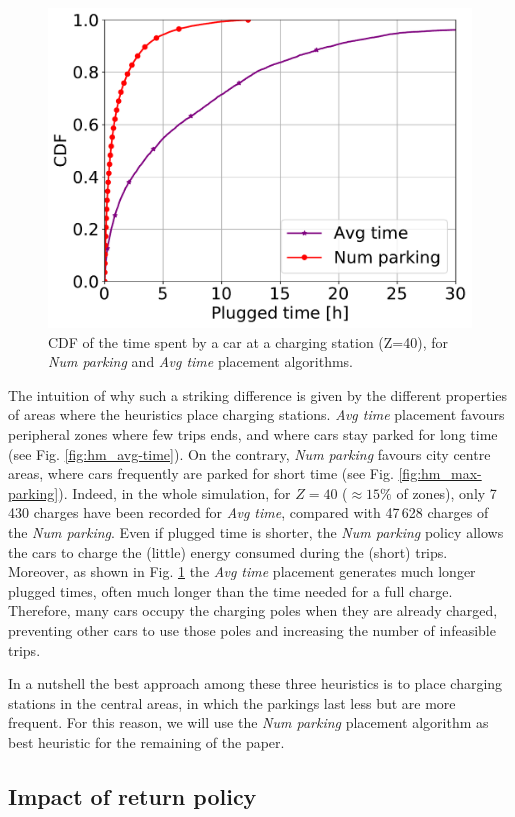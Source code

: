 \begin{figure}[ht]
	\centering
	\includegraphics[width=0.5\columnwidth]{figures/CDF_parking_time_per_algorithm.pdf}
	\caption{CDF of the time spent by a car at a charging station (Z=40), for \textit{Num parking} and \textit{Avg time} placement algorithms. }
		\label{fig:CDF_parking_time_per_algorithm}
\end{figure}

The intuition of why such a striking difference is given by the different properties of areas where the heuristics place charging stations. \textit{Avg time} placement favours peripheral zones where few trips ends, and where cars stay parked for long time (see Fig. \ref{fig:hm_avg-time}). On the contrary, \textit{Num parking} favours city centre areas, where cars frequently are parked for short time (see Fig. \ref{fig:hm_max-parking}). Indeed, in the whole simulation, for $Z=40$ ($\approx 15\%$ of zones), only 7\,430 charges have been recorded for \textit{Avg time}, compared with 47\,628 charges of the \textit{Num parking}.
Even if plugged time is shorter, the \textit{Num parking} policy allows the cars to charge the (little) energy consumed during the (short) trips.
Moreover, as shown in Fig. \ref{fig:CDF_parking_time_per_algorithm} the \textit{Avg time} placement generates much longer plugged times, often much longer than the time needed for a full charge. Therefore, many cars occupy the charging poles when they are already charged, preventing other cars to use those poles and increasing the number of infeasible trips. 

In a nutshell the best approach among these three heuristics is to place charging stations in the central areas, in which the parkings last less but are more frequent. For this reason, we will use the \textit{Num parking} placement algorithm as best heuristic for the remaining of the paper.



\subsection{Impact of return policy}

